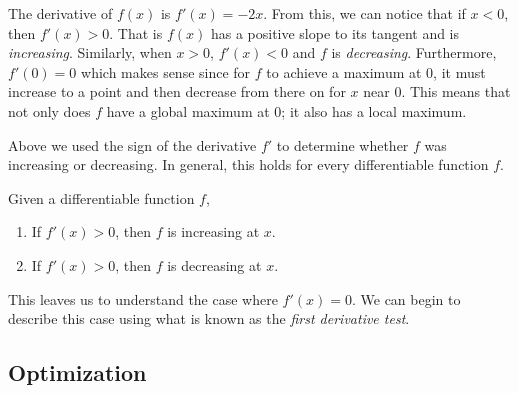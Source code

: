 The derivative of $f(x)$ is $f'(x)=-2x$. From this, we can notice that if $x<0$, then $f'(x)>0$. That is $f(x)$ has a positive slope to its tangent and is \emph{increasing}. Similarly, when $x>0$, $f'(x)<0$ and $f$ is \emph{decreasing}.  Furthermore, $f'(0)=0$ which makes sense since for $f$ to achieve a maximum at 0, it must increase to a point and then decrease from there on for $x$ near 0. This means that not only does $f$ have a global maximum at 0; it also has a local maximum.



Above we used the sign of the derivative $f'$ to determine whether $f$ was increasing or decreasing. In general, this holds for every differentiable function $f$.

\begin{prop}
Given a differentiable function $f$,
\begin{enumerate}
  \item If $f'(x)>0$, then $f$ is increasing at $x$.
  \item If $f'(x)>0$, then $f$ is decreasing at $x$.
\end{enumerate}
\end{prop}

This leaves us to understand the case where $f'(x)=0$. We can begin to describe this case using what is known as the \emph{first derivative test}.

\begin{thm}

\end{thm}







\subsection{Optimization}



